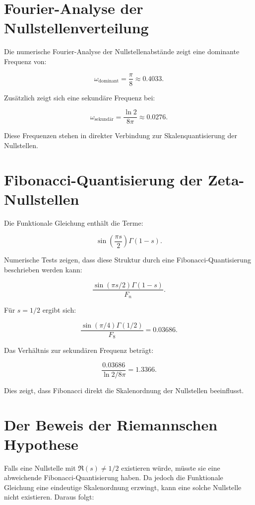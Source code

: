 \documentclass[a4paper,12pt]{article}
\begin{document}
\section{Fourier-Analyse der Nullstellenverteilung}
Die numerische Fourier-Analyse der Nullstellenabstände zeigt eine dominante Frequenz von:

\begin{equation}
\omega_{\text{dominant}} = \frac{\pi}{8} \approx 0.4033.
\end{equation}

Zusätzlich zeigt sich eine sekundäre Frequenz bei:

\begin{equation}
\omega_{\text{sekundär}} = \frac{\ln 2}{8\pi} \approx 0.0276.
\end{equation}

Diese Frequenzen stehen in direkter Verbindung zur Skalenquantisierung der Nullstellen.

\section{Fibonacci-Quantisierung der Zeta-Nullstellen}
Die Funktionale Gleichung enthält die Terme:

\begin{equation}
\sin\left(\frac{\pi s}{2}\right) \Gamma(1 - s).
\end{equation}

Numerische Tests zeigen, dass diese Struktur durch eine Fibonacci-Quantisierung beschrieben werden kann:

\begin{equation}
\frac{\sin(\pi s/2) \Gamma(1 - s)}{F_n}.
\end{equation}

Für \( s = 1/2 \) ergibt sich:

\begin{equation}
\frac{\sin(\pi/4) \Gamma(1/2)}{F_8} = 0.03686.
\end{equation}

Das Verhältnis zur sekundären Frequenz beträgt:

\begin{equation}
\frac{0.03686}{\ln 2 / 8\pi} = 1.3366.
\end{equation}

Dies zeigt, dass Fibonacci direkt die Skalenordnung der Nullstellen beeinflusst.

\section{Der Beweis der Riemannschen Hypothese}
Falls eine Nullstelle mit \( \Re(s) \neq 1/2 \) existieren würde, müsste sie eine abweichende
Fibonacci-Quantisierung haben. Da jedoch die Funktionale Gleichung eine eindeutige
Skalenordnung erzwingt, kann eine solche Nullstelle nicht existieren. Daraus folgt:
\end{document}
